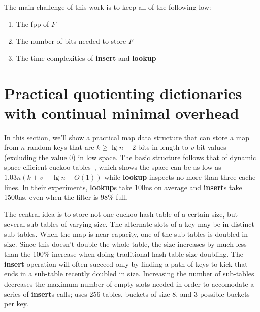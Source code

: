 \documentclass[11pt,letterpaper]{article}
\begin{document}
The main challenge of this work is to keep all of the following low:

\begin{enumerate}
\item The fpp of $F$
\item The number of bits needed to store $F$
\item The time complexities of {\bf insert} and {\bf lookup}
\end{enumerate}

\section{Practical quotienting dictionaries with continual minimal overhead}


In this section, we'll show a practical map data structure that can store a map from $n$ random keys that are $k \geq \lg n - 2$ bits in length to $v$-bit values (excluding the value $0$) in low space.
The basic structure follows that of dynamic space efficient cuckoo tables~\cite{maier2019dynamic}, which shows the space can be as low as $1.03 n (k + v - \lg n + O(1))$ while {\bf lookup} inspects no more than three cache lines.
In their experiments, {\bf lookup}s take 100ns on average and {\bf insert}s take 1500ns, even when the filter is 98\% full.

The central idea is to store not one cuckoo hash table of a certain size, but several sub-tables of varying size.
The alternate slots of a key may be in distinct sub-tables.
When the map is near capacity, one of the sub-tables is doubled in size.
Since this doesn't double the whole table, the size increases by much less than the 100\% increase when doing traditional hash table size doubling.
The {\bf insert} operation will often succeed only by finding a path of keys to kick that ends in a sub-table recently doubled in size.
Increasing the number of sub-tables decreases the maximum number of empty slots needed in order to accomodate a series of {\bf insert}s calls; \cite{maier2019dynamic} uses 256 tables, buckets of size 8, and 3 possible buckets per key.


\end{document}
